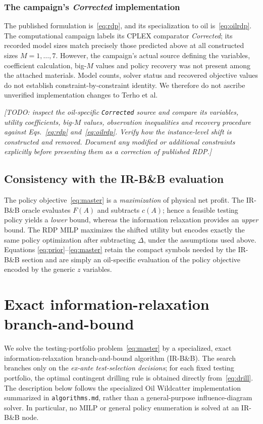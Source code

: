 \documentclass[11pt,a4paper]{article}
\begin{document}
\subsubsection{The campaign's \emph{Corrected} implementation}
The published formulation is~\eqref{eq:rdp}, and its
specialization to oil is~\eqref{eq:oilrdp}.  The computational campaign
labels its CPLEX comparator \emph{Corrected}; its recorded model sizes
match precisely those predicted above at all constructed sizes
$M=1,\ldots,7$.  However, the campaign's actual source defining the
variables, coefficient calculation, big-$M$ values and policy
recovery was not present among the attached materials.  Model counts,
solver status and recovered objective values do not establish
constraint-by-constraint identity.  We therefore do not ascribe
unverified implementation changes to Terho et al.

{\color{BrickRed}\emph{[TODO: inspect the oil-specific \texttt{Corrected}
source and compare its variables, utility coefficients, big-$M$ values,
observation inequalities and recovery procedure against
Eqs.~\eqref{eq:rdp} and~\eqref{eq:oilrdp}.  Verify how the
instance-level shift is constructed and removed.  Document any
modified or additional constraints explicitly before presenting them
as a correction of published RDP.]}}

\subsection{Consistency with the IR-B\&B evaluation}\label{sec:model-irbb}
The policy objective~\eqref{eq:master} is a \emph{maximization} of
physical net profit.  The IR-B\&B oracle evaluates $F(A)$ and
subtracts $c(A)$; hence a feasible testing policy yields a
\emph{lower} bound, whereas the information relaxation provides an
\emph{upper} bound.  The RDP MILP maximizes the shifted utility but
encodes exactly the same policy optimization after subtracting
$\Delta$, under the assumptions used above.  Equations
\eqref{eq:prior}--\eqref{eq:master} retain the compact symbols needed
by the IR-B\&B section and are simply an oil-specific evaluation of
the policy objective encoded by the generic $z$ variables.

\section{Exact information-relaxation branch-and-bound}\label{sec:algorithm}
We solve the testing-portfolio problem~\eqref{eq:master} by a specialized, exact information-relaxation branch-and-bound algorithm (IR-B\&B). The search branches only on the \emph{ex-ante test-selection decisions}; for each fixed testing portfolio, the optimal contingent drilling rule is obtained directly from~\eqref{eq:drill}. The description below follows the specialized Oil Wildcatter implementation summarized in \texttt{algorithms.md}, rather than a general-purpose influence-diagram solver. In particular, no MILP or general policy enumeration is solved at an IR-B\&B node.
\end{document}

